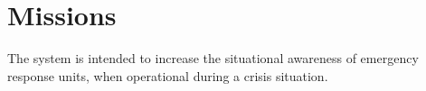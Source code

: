 \section{Missions}
The system is intended to increase the situational awareness of emergency response units, when operational during a crisis situation.